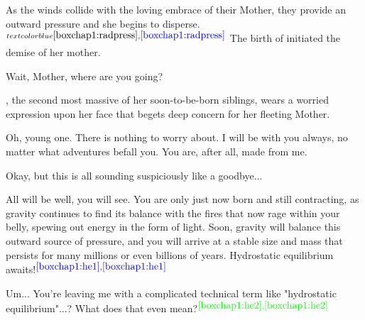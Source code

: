 \documentclass[main.tex]{subfiles}
\begin{document}
\par \nar As the winds collide with the loving embrace of their Mother, they provide an outward pressure and she begins to disperse.$^{textcolor{blue}{{\ref{boxchap1:radpress}},\textcolor{blue}{\ref{boxchap1:radpress}}}}$  The birth of \rmmaia initiated the demise of her mother.  

\par \Maia Wait, Mother, where are you going?  

\par \nar \rmmaia, the second most massive of her soon-to-be-born siblings, wears a worried expression upon her face that begets deep concern for her fleeting Mother.  





\par \Pleione Oh, young one.  There is nothing to worry about.  I will be with you always, no matter what adventures befall you.  You are, after all, made from me.  

\par \Maia Okay, but this is all sounding suspiciously like a goodbye...

\par \Pleione All will be well, you will see.  You are only just now born and still contracting, as gravity continues to find its balance with the fires that now rage within your belly, spewing out energy in the form of light.  Soon, gravity will balance this outward source of pressure, and you will arrive at a stable size and mass that persists for many millions or even billions of years. Hydrostatic equilibrium awaits!$^{\textcolor{blue}{{\ref{boxchap1:he1}},\textcolor{blue}{\ref{boxchap1:he1}}}}$

\par \Maia Um... You're leaving me with a complicated technical term like "hydrostatic equilibrium"...?  What does that even mean?$^{\textcolor{green}{{\ref{boxchap1:he2}},\textcolor{green}{\ref{boxchap1:he2}}}}$
\end{document}
